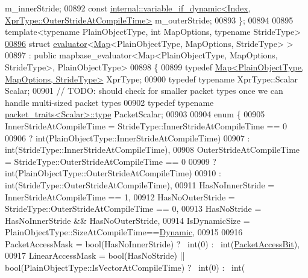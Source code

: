 \begin{DoxyCode}
       m\_innerStride;
00892   \textcolor{keyword}{const} \hyperlink{class_eigen_1_1internal_1_1variable__if__dynamic}{internal::variable\_if\_dynamic<Index, XprType::OuterStrideAtCompileTime>}
       m\_outerStride;
00893 \};
00894 
00895 \textcolor{keyword}{template}<\textcolor{keyword}{typename} PlainObjectType, \textcolor{keywordtype}{int} MapOptions, \textcolor{keyword}{typename} Str\textcolor{keywordtype}{id}eType> 
\hyperlink{struct_eigen_1_1internal_1_1evaluator_3_01_map_3_01_plain_object_type_00_01_map_options_00_01_stride_type_01_4_01_4}{00896} \textcolor{keyword}{struct }\hyperlink{struct_eigen_1_1internal_1_1evaluator}{evaluator}<\hyperlink{group___core___module_class_eigen_1_1_map}{Map}<PlainObjectType, MapOptions, StrideType> >
00897   : \textcolor{keyword}{public} mapbase\_evaluator<Map<PlainObjectType, MapOptions, StrideType>, PlainObjectType>
00898 \{
00899   \textcolor{keyword}{typedef} \hyperlink{group___core___module_class_eigen_1_1_map}{Map<PlainObjectType, MapOptions, StrideType>} XprType;
00900   \textcolor{keyword}{typedef} \textcolor{keyword}{typename} XprType::Scalar Scalar;
00901   \textcolor{comment}{// TODO: should check for smaller packet types once we can handle multi-sized packet types}
00902   \textcolor{keyword}{typedef} \textcolor{keyword}{typename} \hyperlink{struct_eigen_1_1internal_1_1packet__traits}{packet\_traits<Scalar>::type} PacketScalar;
00903   
00904   \textcolor{keyword}{enum} \{
00905     InnerStrideAtCompileTime = StrideType::InnerStrideAtCompileTime == 0
00906                              ? int(PlainObjectType::InnerStrideAtCompileTime)
00907                              : int(StrideType::InnerStrideAtCompileTime),
00908     OuterStrideAtCompileTime = StrideType::OuterStrideAtCompileTime == 0
00909                              ? int(PlainObjectType::OuterStrideAtCompileTime)
00910                              : int(StrideType::OuterStrideAtCompileTime),
00911     HasNoInnerStride = InnerStrideAtCompileTime == 1,
00912     HasNoOuterStride = StrideType::OuterStrideAtCompileTime == 0,
00913     HasNoStride = HasNoInnerStride && HasNoOuterStride,
00914     IsDynamicSize = PlainObjectType::SizeAtCompileTime==\hyperlink{namespace_eigen_ad81fa7195215a0ce30017dfac309f0b2}{Dynamic},
00915     
00916     PacketAccessMask = bool(HasNoInnerStride) ? ~int(0) : ~int(\hyperlink{group__flags_ga1a306a438e1ab074e8be59512e887b9f}{PacketAccessBit}),
00917     LinearAccessMask = bool(HasNoStride) || bool(PlainObjectType::IsVectorAtCompileTime) ? ~int(0) : ~int(

\end{DoxyCode}
